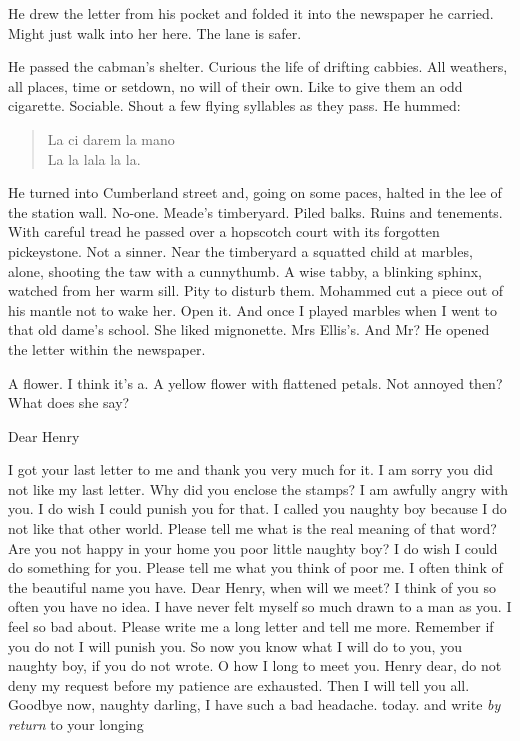 He drew the letter from his pocket
and folded it into the newspaper he carried.
Might just walk into her here.
The lane is safer.

He passed the cabman's shelter.
Curious the life of drifting cabbies.
All weathers, all places,
time or setdown,
no will of their own.
Like to give them an odd cigarette.
Sociable.
Shout a few flying syllables as they pass.
He hummed:


\begin{verse}
    La ci darem la mano \\
    La la lala la la.
\end{verse}


He turned into Cumberland street
and, going on some paces,
halted in the lee of the station wall.
No-one.
Meade's timberyard.
Piled balks.
Ruins and tenements.
With careful tread
he passed over a hopscotch court with its forgotten pickeystone.
Not a sinner.
Near the timberyard a squatted child at marbles,
alone,
shooting the taw with a cunnythumb.
A wise tabby, a blinking sphinx,
watched from her warm sill.
Pity to disturb them.
Mohammed cut a piece out of his mantle not to wake her.
Open it.
And once I played marbles when I went to that old dame's school.
She liked mignonette.
Mrs Ellis's.
And Mr?
He opened the letter within the newspaper.

A flower.
I think it's a.
A yellow flower with flattened petals.
Not annoyed then?
What does she say?


    Dear Henry

I got your last letter to me and thank you very much for it.
I am sorry you did not like my last letter.
Why did you enclose the stamps?
I am awfully angry with you.
I do wish I could punish you for that.
I called you naughty boy
because I do not like that other world.
Please tell me what is the real meaning of that word?
Are you not happy in your home
you poor little naughty boy?
I do wish I could do something for you.
Please tell me what you think of poor me.
I often think of the beautiful name you have.
Dear Henry,
when will we meet?
I think of you so often
you have no idea.
I have never felt myself so much drawn to a man as you.
I feel so bad about.
Please write me a long letter and tell me more.
Remember if you do not
I will punish you.
So now you know what I will do to you,
you naughty boy, if you do not wrote.
O how I long to meet you.
Henry dear, do not deny my request before my patience are exhausted.
Then I will tell you all.
Goodbye now, naughty darling,
I have such a bad headache.
today.
and write \emph{by return} to your longing


